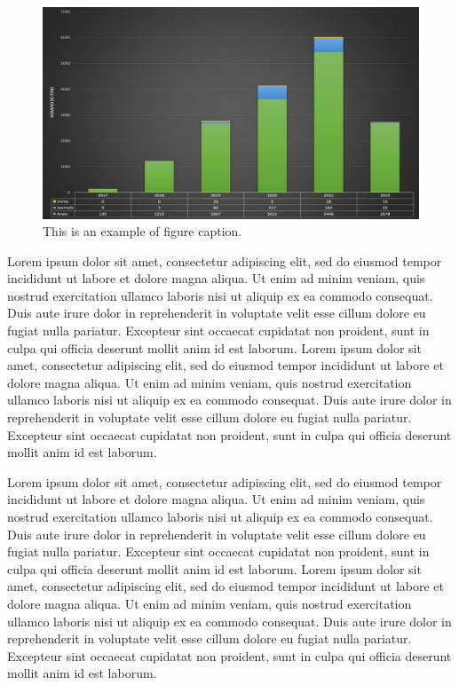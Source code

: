 \documentclass[english]{sbc2025}%
\begin{document}
\begin{figure}
\begin{center}
\includegraphics[width=30pc]{sol.jpg}
\caption{{This is an example of figure caption.}}
 \label{Fig2}
\end{center}
\end{figure}

Lorem ipsum dolor sit amet, consectetur adipiscing elit, sed do eiusmod tempor incididunt ut labore et dolore magna aliqua. Ut enim ad minim veniam, quis nostrud exercitation ullamco laboris nisi ut aliquip ex ea commodo consequat. Duis aute irure dolor in reprehenderit in voluptate velit esse cillum dolore eu fugiat nulla pariatur. Excepteur sint occaecat cupidatat non proident, sunt in culpa qui officia deserunt mollit anim id est laborum. Lorem ipsum dolor sit amet, consectetur adipiscing elit, sed do eiusmod tempor incididunt ut labore et dolore magna aliqua. Ut enim ad minim veniam, quis nostrud exercitation ullamco laboris nisi ut aliquip ex ea commodo consequat. Duis aute irure dolor in reprehenderit in voluptate velit esse cillum dolore eu fugiat nulla pariatur. Excepteur sint occaecat cupidatat non proident, sunt in culpa qui officia deserunt mollit anim id est laborum.

Lorem ipsum dolor sit amet, consectetur adipiscing elit, sed do eiusmod tempor incididunt ut labore et dolore magna aliqua. Ut enim ad minim veniam, quis nostrud exercitation ullamco laboris nisi ut aliquip ex ea commodo consequat. Duis aute irure dolor in reprehenderit in voluptate velit esse cillum dolore eu fugiat nulla pariatur. Excepteur sint occaecat cupidatat non proident, sunt in culpa qui officia deserunt mollit anim id est laborum. Lorem ipsum dolor sit amet, consectetur adipiscing elit, sed do eiusmod tempor incididunt ut labore et dolore magna aliqua. Ut enim ad minim veniam, quis nostrud exercitation ullamco laboris nisi ut aliquip ex ea commodo consequat. Duis aute irure dolor in reprehenderit in voluptate velit esse cillum dolore eu fugiat nulla pariatur. Excepteur sint occaecat cupidatat non proident, sunt in culpa qui officia deserunt mollit anim id est laborum.
\end{document}
